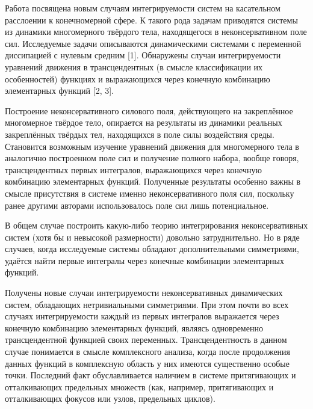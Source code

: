 



Работа посвящена новым случаям интегрируемости систем на касательном
расслоении к конечномерной сфере. К такого рода задачам приводятся
системы из динамики многомерного твёрдого тела, находящегося в
неконсервативном поле сил. Исследуемые задачи описываются
динамическими системами с переменной диссипацией с нулевым средним
[1]. Обнаружены случаи интегрируемости уравнений движения в
трансцендентных (в смысле классификации их особенностей) функциях и
выражающихся через конечную комбинацию элементарных функций [2, 3].

Построение неконсервативного силового поля, действующего на
закреплённое многомерное твёрдое тело, опирается на результаты из
динамики реальных закреплённых твёрдых тел, находящихся в поле силы
воздействия среды. Становится возможным изучение уравнений движения
для многомерного тела в аналогично построенном поле сил и получение
полного набора, вообще говоря, трансцендентных первых интегралов,
выражающихся через конечную комбинацию элементарных функций.
Полученные результаты особенно важны в смысле присутствия в системе
именно неконсервативного поля сил, поскольку ранее другими авторами
использовалось поле сил лишь потенциальное.



В общем случае построить какую-либо теорию интегрирования
неконсервативных систем (хотя бы и невысокой размерности) довольно
затруднительно. Но в ряде случаев, когда исследуемые системы
обладают дополнительными симметриями, удаётся найти первые интегралы
через конечные комбинации элементарных функций.

Получены новые случаи интегрируемости неконсервативных динамических
систем, обладающих нетривиальными симметриями. При этом почти во
всех случаях интегрируемости каждый из первых интегралов выражается
через конечную комбинацию элементарных функций, являясь одновременно
трансцендентной функцией своих переменных. Трансцендентность в
данном случае понимается в смысле комплексного анализа, когда после
продолжения данных функций в комплексную область у них имеются
существенно особые точки. Последний факт обуславливается наличием в
системе притягивающих и отталкивающих предельных множеств (как,
например, притягивающих и отталкивающих фокусов или узлов,
предельных циклов).



